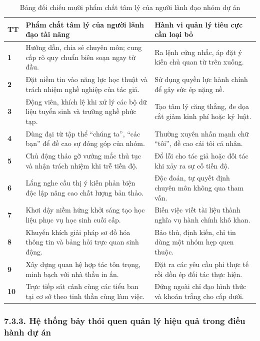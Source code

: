 \begin{table}[htbp]
\centering
\caption{Bảng đối chiếu mười phẩm chất tâm lý của người lãnh đạo nhóm dự án}
\label{tab:lanh_dao}
\small
{}
\begin{tabularx}{\textwidth}{|C{0.8cm}|Y|Y|}
\hline
\textbf{TT} & \textbf{Phẩm chất tâm lý của người lãnh đạo tài năng} & \textbf{Hành vi quản lý tiêu cực cần loại bỏ} \\
\hline
\textbf{1} & Hướng dẫn, chia sẻ chuyên môn; cung cấp rõ quy chuẩn biên soạn ngay từ đầu. & Ra lệnh cứng nhắc, áp đặt ý kiến chủ quan từ trên xuống. \\
\hline
\textbf{2} & Đặt niềm tin vào năng lực học thuật và trách nhiệm nghề nghiệp của tác giả. & Sử dụng quyền lực hành chính để gây sức ép nặng nề. \\
\hline
\textbf{3} & Động viên, khích lệ khi xử lý các bộ dữ liệu tuyển sinh và trường nghề phức tạp. & Tạo tâm lý căng thẳng, đe dọa cắt giảm kinh phí hoặc kỷ luật. \\
\hline
\textbf{4} & Dùng đại từ tập thể ``chúng ta'', ``các bạn'' để đề cao sự đóng góp của nhóm. & Thường xuyên nhấn mạnh chữ ``tôi'', đề cao cái tôi cá nhân. \\
\hline
\textbf{5} & Chủ động tháo gỡ vướng mắc thủ tục và nhận trách nhiệm khi trễ tiến độ. & Đổ lỗi cho tác giả hoặc đối tác khi xảy ra sự cố tiến độ. \\
\hline
\textbf{6} & Lắng nghe cầu thị ý kiến phản biện độc lập nâng cao chất lượng bản thảo. & Độc đoán, tự quyết định chuyên môn không qua tham vấn. \\
\hline
\textbf{7} & Khơi dậy niềm hứng khởi sáng tạo học liệu phục vụ học sinh cuối cấp. & Biến việc viết tài liệu thành nghĩa vụ hành chính khô khan. \\
\hline
\textbf{8} & Khuyến khích giải pháp sơ đồ hóa thông tin và bảng hỏi trực quan sinh động. & Bảo thủ, định kiến, chỉ tin dùng một nhóm hẹp quen thuộc. \\
\hline
\textbf{9} & Xây dựng quan hệ hợp tác tôn trọng, minh bạch với nhà thầu in ấn. & Đặt ra các yêu cầu phi thực tế rồi dồn ép đối tác thực hiện. \\
\hline
\textbf{10} & Trực tiếp sát cánh cùng các tiểu ban tại cơ sở theo tinh thần cùng làm việc. & Đứng ngoài chỉ đạo hình thức và khoán trắng cho cấp dưới. \\
\hline
\end{tabularx}
\end{table}

\subsubsection{7.3.3. Hệ thống bảy thói quen quản lý hiệu quả trong điều hành dự án}

